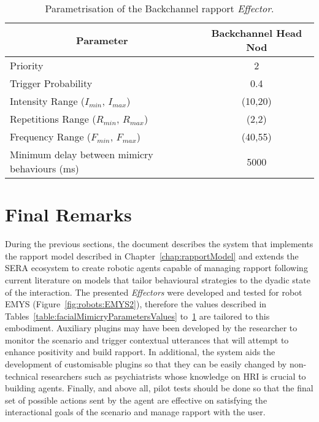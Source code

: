 \begin{table}[H]
	\centering
	\begin{tabular}{|l|c|}
	\hline
	\multicolumn{1}{|c|}{\textbf{Parameter}} & \textbf{Backchannel Head Nod}\\ \hline
		Priority & 2 \\ \hline
		Trigger Probability & 0.4 \\ \hline
		Intensity Range ($I_{min}$, $I_{max}$) & (10,20) \\ \hline
		Repetitions Range ($R_{min}$, $R_{max}$) & (2,2) \\ \hline
		Frequency Range ($F_{min}$, $F_{max}$) &  (40,55) \\ \thickhline		
		Minimum delay between mimicry behaviours (ms) & 5000 \\ \hline		
	\end{tabular}
	\caption{Parametrisation of the Backchannel rapport \textit{Effector}.}
	\label{table:headGesturesMimicryParametersValues}
\end{table}

\section{Final Remarks}
During the previous sections, the document describes the system that implements the rapport model described in Chapter~\ref{chap:rapportModel} and extends the \ac{SERA} ecosystem to create robotic agents capable of managing rapport following current literature on models that tailor behavioural strategies to the dyadic state of the interaction. The presented \textit{Effectors} were developed and tested for robot \ac{EMYS} (Figure~\ref{fig:robots:EMYS2}), therefore the values described in Tables~\ref{table:facialMimicryParametersValues} to~\ref{table:headGesturesMimicryParametersValues} are tailored to this embodiment. Auxiliary plugins may have been developed by the researcher to monitor the scenario and trigger contextual utterances that will attempt to enhance positivity and build rapport.  In additional, the system aids the development of customisable plugins so that they can be easily changed by non-technical researchers such as psychiatrists whose knowledge on \ac{HRI} is crucial to building agents. Finally, and above all, pilot tests should be done so that the final set of possible actions sent by the agent are effective on satisfying the interactional goals of the scenario and manage rapport with the user.



